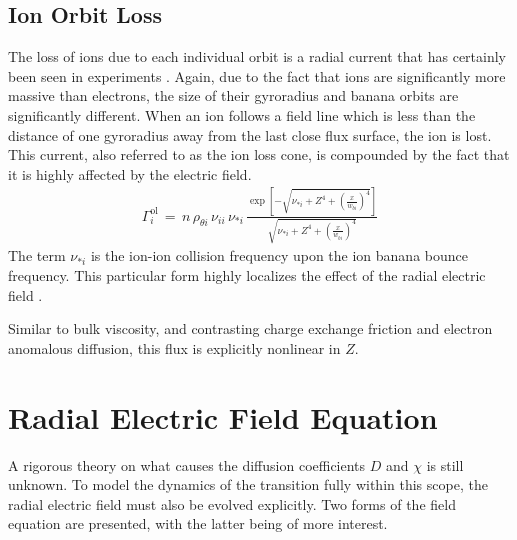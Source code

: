 \subsection{Ion Orbit Loss}\label{ssec:ol_loss}
The loss of ions due to each individual orbit is a radial current that has certainly been seen in experiments \cite{weisen_boundary_1991}.
Again, due to the fact that ions are significantly more massive than electrons, the size of their gyroradius and banana orbits are significantly different.
When an ion follows a field line which is less than the distance of one gyroradius away from the last close flux surface, the ion is lost.
This current, also referred to as the ion loss cone, is compounded by the fact that it is highly affected by the electric field.
\begin{align} %
	\Gamma_i^\text{ol} \,=\, n \, \rho_{\theta i} \, \nu_{ii} \, \nu_{*i} \,
		\frac{\exp\left[-\sqrt{\nu_{*i} + Z^4
		+ \left(\frac{x}{w_{bi}}\right)^4}\right]}{\sqrt{\nu_{*i} + Z^4
		+ \left(\frac{x}{w_{bi}}\right)^4}} \label{eq:Gamma_ol}
\end{align}
The term $\nu_{*i}$ is the ion-ion collision frequency upon the ion banana bounce frequency. %
This particular form highly localizes the effect of the radial electric field \cite{kobayashi_experimental_2016}.

Similar to bulk viscosity, and contrasting charge exchange friction and electron anomalous diffusion, this flux is explicitly nonlinear in $Z$.


\section{Radial Electric Field Equation}\label{sec:Z_equation}
A rigorous theory on what causes the diffusion coefficients $D$ and $\chi$ is still unknown.
To model the dynamics of the transition fully within this scope, the radial electric field must also be evolved explicitly.
Two forms of the field equation are presented, with the latter being of more interest.

